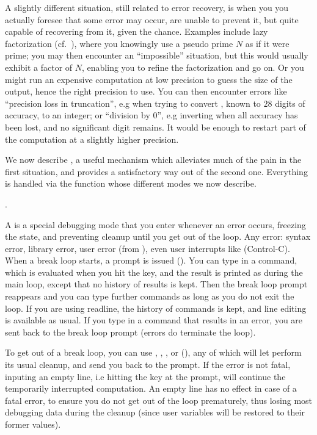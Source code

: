 A slightly different situation, still related to error recovery, is when you
you actually foresee that some error may occur, are unable to prevent it, but
quite capable of recovering from it, given the chance. Examples include lazy
factorization (cf.~), where you knowingly use a pseudo prime
$N$ as if it were prime; you may then encounter an ``impossible'' situation,
but this would usually exhibit a factor of $N$, enabling you to refine the
factorization and go on. Or you might run an expensive computation at low
precision to guess the size of the output, hence the right precision to use.
You can then encounter errors like ``precision loss in truncation'', e.g when
trying to convert , known to $28$ digits of accuracy, to an
integer; or ``division by 0'', e.g inverting  when all accuracy
has been lost, and no significant digit remains. It would be enough to
restart part of the computation at a slightly higher precision.

We now describe , a useful mechanism which alleviates
much of the pain in the first situation, and provides a satisfactory way out
of the second one. Everything is handled via the  function whose
different modes we now describe.

.\label{se:breakloop}

A  is a special debugging mode that you enter whenever an
error occurs, freezing the  state, and preventing cleanup until you get out
of the loop. Any error: syntax error, library error, user error (from
), even user interrupts like  (Control-C). When a break
loop starts, a prompt is issued (). You can type in a  command,
which is evaluated when you hit the  key, and the result is
printed as during the main  loop, except that no history of results
is kept.
Then the break loop prompt reappears and you can type further commands as
long as you do not exit the loop. If you are using readline, the history of
commands is kept, and line editing is available as usual. If you type in a
command that results in an error, you are sent back to the break loop prompt
(errors do  terminate the loop).

To get out of a break loop, you can use , ,
, or  (), any of which will let  perform its
usual cleanup, and send you back to the  prompt. If the error is not fatal,
inputing an empty line, i.e hitting the  key at the
 prompt, will continue the temporarily interrupted computation.
An empty line has no effect in case of a fatal error, to ensure you do not
get out of the loop prematurely, thus losing most debugging data during the
cleanup (since user variables will be restored to their former values).

